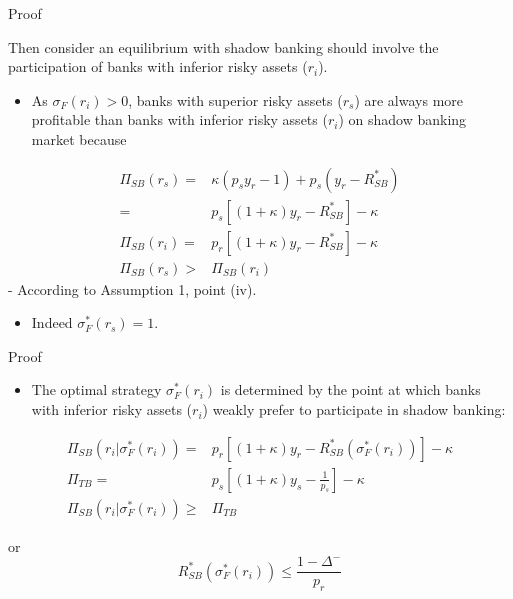 \documentclass[
  ignorenonframetext,
]{beamer}
\providecommand{\tightlist}{%
  \setlength{\itemsep}{0pt}\setlength{\parskip}{0pt}}
\begin{document}
\begin{frame}{Proof}
\protect\hypertarget{proof-2}{}

Then consider an equilibrium with shadow banking should involve the
participation of banks with inferior risky assets (\(r_{i}\)).

\begin{itemize}
\tightlist
\item
  As \(\sigma_{F}(r_{i})>0\), banks with superior risky assets
  (\(r_{s}\)) are always more profitable than banks with inferior risky
  assets (\(r_{i}\)) on shadow banking market because
\end{itemize}

\[
\begin{align*}
\Pi_{SB}(r_{s})=&\kappa(p_{s}y_{r}-1)+p_{s}(y_{r}-R^*_{SB})\\
=&p_{s}[(1+\kappa)y_{r}-R^*_{SB}]-\kappa\\
\Pi_{SB}(r_{i})=&p_{r}[(1+\kappa)y_{r}-R^*_{SB}]-\kappa\\
\Pi_{SB}(r_{s})>&\Pi_{SB}(r_{i})
\end{align*}
\] - According to Assumption 1, point (iv).

\begin{itemize}
\tightlist
\item
  Indeed \(\sigma^*_{F}(r_{s})=1\).
\end{itemize}

\end{frame}

\begin{frame}{Proof}
\protect\hypertarget{proof-3}{}

\begin{itemize}
\tightlist
\item
  The optimal strategy \(\sigma^*_{F}(r_{i})\) is determined by the
  point at which banks with inferior risky assets (\(r_{i}\)) weakly
  prefer to participate in shadow banking:
\end{itemize}

\[
\begin{align*}
\Pi_{SB}(r_{i}|\sigma^*_{F}(r_{i}))=&p_{r}[(1+\kappa)y_{r}-R^*_{SB}(\sigma^*_{F}(r_{i}))]-\kappa\\
\Pi_{TB}=&p_{s}[(1+\kappa)y_{s}-\frac{1}{p_{s}}]-\kappa\\
\Pi_{SB}(r_{i}|\sigma^*_{F}(r_{i}))\geq &\Pi_{TB}
\end{align*}
\]

or \[
R^*_{SB}(\sigma^*_{F}(r_{i}))\leq\frac{1-\Delta^-}{p_{r}}
\]

\end{frame}
\end{document}
